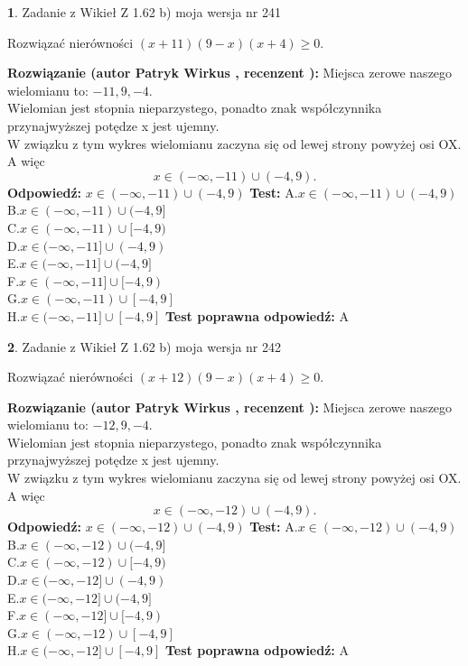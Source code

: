 \documentclass[12pt, a4paper]{article}
\theoremstyle{definition} %
\newtheorem{zad}{}
\newcommand{\zadStart}[1]{\begin{zad}#1\newline}
\newcommand{\zadStop}{\end{zad}}
\newcommand{\rozwStart}[2]{\noindent \textbf{Rozwiązanie (autor #1 , recenzent #2): }\newline}
\newcommand{\rozwStop}{\newline}
\newcommand{\odpStart}{\noindent \textbf{Odpowiedź:}\newline}
\newcommand{\odpStop}{\newline}
\newcommand{\testStart}{\noindent \textbf{Test:}\newline}
\newcommand{\testStop}{\newline}
\newcommand{\kluczStart}{\noindent \textbf{Test poprawna odpowiedź:}\newline}
\newcommand{\kluczStop}{\newline}
\begin{document}
\zadStart{Zadanie z Wikieł Z 1.62 b) moja wersja nr 241}

Rozwiązać nierówności $(x+11)(9-x)(x+4)\ge0$.
\zadStop
\rozwStart{Patryk Wirkus}{}
Miejsca zerowe naszego wielomianu to: $-11, 9, -4$.\\
Wielomian jest stopnia nieparzystego, ponadto znak współczynnika przy\linebreak najwyższej potędze x jest ujemny.\\ W związku z tym wykres wielomianu zaczyna się od lewej strony powyżej osi OX. A więc $$x \in (-\infty,-11) \cup (-4,9).$$
\rozwStop
\odpStart
$x \in (-\infty,-11) \cup (-4,9)$
\odpStop
\testStart
A.$x \in (-\infty,-11) \cup (-4,9)$\\
B.$x \in (-\infty,-11) \cup (-4,9]$\\
C.$x \in (-\infty,-11) \cup [-4,9)$\\
D.$x \in (-\infty,-11] \cup (-4,9)$\\
E.$x \in (-\infty,-11] \cup (-4,9]$\\
F.$x \in (-\infty,-11] \cup [-4,9)$\\
G.$x \in (-\infty,-11) \cup [-4,9]$\\
H.$x \in (-\infty,-11] \cup [-4,9]$
\testStop
\kluczStart
A
\kluczStop



\zadStart{Zadanie z Wikieł Z 1.62 b) moja wersja nr 242}

Rozwiązać nierówności $(x+12)(9-x)(x+4)\ge0$.
\zadStop
\rozwStart{Patryk Wirkus}{}
Miejsca zerowe naszego wielomianu to: $-12, 9, -4$.\\
Wielomian jest stopnia nieparzystego, ponadto znak współczynnika przy\linebreak najwyższej potędze x jest ujemny.\\ W związku z tym wykres wielomianu zaczyna się od lewej strony powyżej osi OX. A więc $$x \in (-\infty,-12) \cup (-4,9).$$
\rozwStop
\odpStart
$x \in (-\infty,-12) \cup (-4,9)$
\odpStop
\testStart
A.$x \in (-\infty,-12) \cup (-4,9)$\\
B.$x \in (-\infty,-12) \cup (-4,9]$\\
C.$x \in (-\infty,-12) \cup [-4,9)$\\
D.$x \in (-\infty,-12] \cup (-4,9)$\\
E.$x \in (-\infty,-12] \cup (-4,9]$\\
F.$x \in (-\infty,-12] \cup [-4,9)$\\
G.$x \in (-\infty,-12) \cup [-4,9]$\\
H.$x \in (-\infty,-12] \cup [-4,9]$
\testStop
\kluczStart
A
\kluczStop
\end{document}
